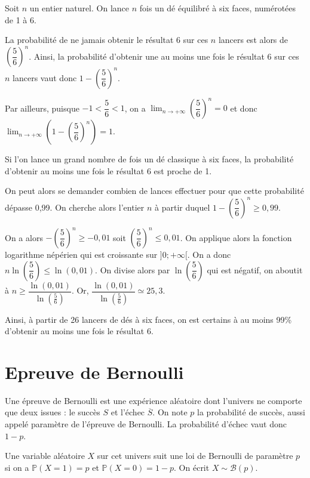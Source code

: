 \documentclass[11pt,fleqn, openany]{book} %
\begin{document}
\begin{example}Soit $n$ un entier naturel. On lance $n$ fois un dé équilibré à six faces, numérotées de 1 à 6.

La probabilité de ne jamais obtenir le résultat 6 sur ces $n$ lancers est alors de $\left(\dfrac{5}{6}\right)^n$. Ainsi, la probabilité d'obtenir une au moins une fois le résultat 6 sur ces $n$ lancers vaut donc $1-\left(\dfrac{5}{6}\right)^n$.

Par ailleurs, puisque $-1< \dfrac{5}{6}<1$, on a $\displaystyle\lim_{n \to +\infty}\left(\dfrac{5}{6}\right)^n=0$ et donc $\displaystyle\lim_{n \to +\infty}\left(1-\left(\dfrac{5}{6}\right)^n\right)=1$.

Si l'on lance un grand nombre de fois un dé classique à six faces, la probabilité d'obtenir au moins une fois le résultat 6 est proche de 1.

On peut alors se demander combien de lances effectuer pour que cette probabilité dépasse 0,99. On cherche alors l'entier $n$ à partir duquel $1-\left(\dfrac{5}{6}\right)^n \geqslant 0,99$.

On a alors $-\left(\dfrac{5}{6}\right)^n \geqslant -0,01$ soit $\left(\dfrac{5}{6}\right)^n \leqslant 0,01$. On applique alors la fonction logarithme népérien qui est croissante sur $]0;+\infty[$. On a donc $n\ln\left(\dfrac{5}{6}\right)\leqslant \ln(0,01)$. On divise alors par $\ln\left(\dfrac{5}{6}\right)$ qui est négatif, on aboutit à $n\geqslant \dfrac{\ln(0,01)}{\ln\left(\frac{5}{6}\right)}$. Or, $ \dfrac{\ln(0,01)}{\ln\left(\frac{5}{6}\right)}\simeq 25,3$.

 Ainsi, à partir de 26 lancers de dés à six faces, on est certains à au moins 99\% d'obtenir au moins une fois le résultat 6.
\end{example}

\newpage 
\section{Epreuve de Bernoulli}

\begin{definition}Une épreuve de Bernoulli est une expérience aléatoire dont l'univers ne comporte que deux issues : le succès $S$ et l'échec $\overline{S}$. On note $p$ la probabilité de succès, aussi appelé paramètre de l'épreuve de Bernoulli. La probabilité d'échec vaut donc $1-p$.

Une variable aléatoire $X$ sur cet univers suit une loi de Bernoulli de paramètre $p$ si on a $\mathbb{P}(X=1)=p$ et $\mathbb{P}(X=0)=1-p$. On écrit $X \sim \mathcal{B}(p)$.\end{definition}
\end{document}
